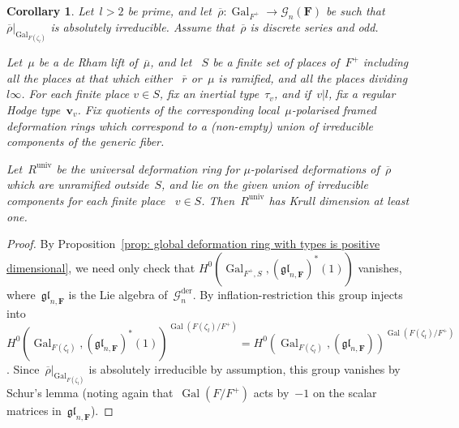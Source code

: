 \documentclass{amsart}
\renewcommand{\mathbb}{\mathbf}
\newcommand{\mubar}{\overline{\mu}}
\def\fgl{\mathfrak{gl}}
\def\der{\mathrm{der}}
\newcommand{\univ}{{\operatorname{univ}}}
\newtheorem{cor}[subsubsection]{Corollary}
\theoremstyle{definition}
\theoremstyle{remark}
\newcommand{\mar}[1]{}
\newcommand{\mar}[1]{\marginpar{\raggedright\tiny squirrel #1}}
\newcommand{\F}{\FF}
\newcommand{\FF}{{\mathbb F}}
\newcommand{\bv}{\ensuremath{\mathbf{v}}}
\newcommand{\cG}{{\mathcal G}}
\DeclareMathOperator{\Gal}{Gal}
\newcommand{\rhobar}{\overline{\rho}}
\newcommand{\rbar}{\overline{r}}
\begin{document}
\begin{cor}
  \label{cor: global deformation ring is positive dimensional, unitary
  case}
  Let~$l>2$ be prime, and let~$\rhobar:\Gal_{F^+}\to\cG_n(\F) $ be such
  that~$\rhobar|_{\Gal_{F(\zeta_l)}}$ is absolutely irreducible. Assume that~$\rhobar$ is
  discrete series and odd.

Let~$\mu$ be a de Rham
  lift of~$\mubar$, and let ~$S$ be a finite set of 
  places of~$F^+$ including all the places at  that which either
  ~$\rbar$ or~$\mu$ is ramified, and all the places dividing~$l\infty$.
 For each finite place $v\in S$, fix an inertial type~$\tau_v$, and
 if~$v|l$, fix a regular Hodge type~$\bv_v$. Fix quotients of the
 corresponding local~$\mu$-polarised framed deformation rings which
 correspond to a \emph{(}non-empty\emph{)} union of irreducible components of the generic fiber.

  Let~$R^\univ$ be the universal deformation ring for $\mu$-polarised
  deformations of~$\rhobar$ which are unramified outside~$S$, and lie on
  the given union of irreducible components for each finite place ~$v\in S$. Then~$R^\univ$ has Krull
  dimension at least one.
\end{cor}
\begin{proof}By Proposition~\ref{prop: global deformation ring with
    types is positive dimensional}, we need only check that
  $H^0(\Gal_{F^+,S},(\fgl_{n,\F})^*(1))$ vanishes,
  where~$\fgl_{n,\F}$ is the Lie algebra of~$\cG_n^{\der}$. By
  inflation-restriction this group injects into
  $H^0(\Gal_{F(\zeta_l)},(\fgl_{n,\F})^*(1))^{\Gal(F(\zeta_l)/F^+)}=H^0(\Gal_{F(\zeta_l)},(\fgl_{n,\F}))^{\Gal(F(\zeta_l)/F^+)}$.
  Since~$\rhobar|_{\Gal_{F(\zeta_l)}}$ is absolutely irreducible by
  assumption, this group vanishes by Schur's lemma (noting again
  that~$\Gal(F/F^+)$ acts by~$-1$ on the scalar matrices
  in~$\fgl_{n,\F}$).
\end{proof}
\end{document}
